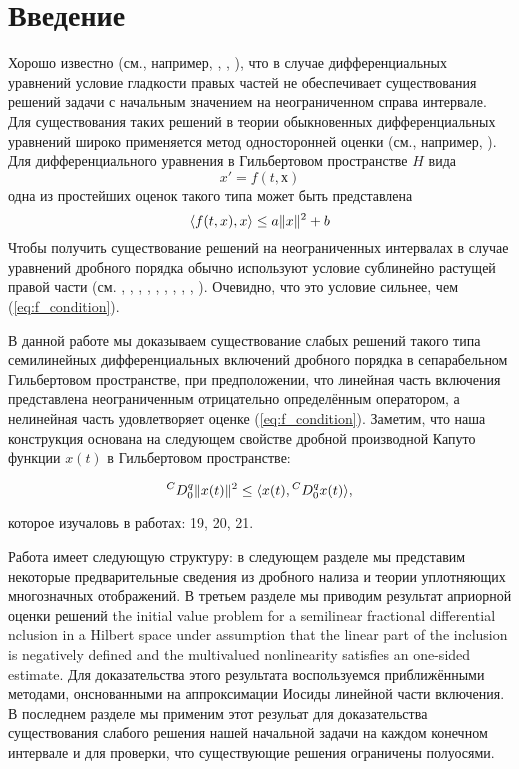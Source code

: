 \section{Введение}

Хорошо известно (см., например, \cite{coddington}, \cite{hartman}, \cite{krasnoselskii}), что в случае
дифференциальных уравнений условие гладкости правых частей не обеспечивает существования решений задачи с
начальным значением на неограниченном справа интервале. Для существования таких решений в теории обыкновенных
дифференциальных уравнений широко применяется метод односторонней оценки (см., например, \cite{coddington}).
Для дифференциального уравнения в Гильбертовом пространстве $H$ вида
\begin{equation*}
    x' = f(t,х)
\end{equation*}
\noindent одна из простейших оценок такого типа может быть представлена
\begin{equation}
    \label{eq:f_condition}
    \langle f(t,x),x\rangle \leq a \lVert x\rVert^{2} + b
\end{equation}
\noindent Чтобы получить существование решений на неограниченных интервалах в случае уравнений дробного порядка
обычно используют условие сублинейно растущей правой части (см. \cite{afanasova_nca}, \cite{afanasova_rm}, \cite{appell},
\cite{benedetti}, \cite{mainardi}, \cite{kamenskii_fpt}, \cite{kamenskii_aa}, \cite{kamenskii_fpta17}, \cite{kamenskii_fpta19},
\cite{kamenskii_m}). Очевидно, что это условие сильнее, чем (\ref{eq:f_condition}).

В данной работе мы доказываем существование слабых решений такого типа семилинейных дифференциальных включений дробного
порядка в сепарабельном Гильбертовом пространстве, при предположении, что линейная часть включения представлена неограниченным
отрицательно определённым оператором, а нелинейная часть удовлетворяет оценке (\ref{eq:f_condition}). Заметим, что
наша конструкция основана на следующем свойстве дробной производной Капуто функции $x(t)$ в Гильбертовом пространстве:

\begin{equation*}
    {}^{C} D_{0}^{q} \lVert x(t)\rVert^{2} \leq \langle x(t), {}^{C} D_{0}^{q} x(t) \rangle,
\end{equation*}

\noindent которое изучаловь в работах: 19, 20, 21.

Работа имеет следующую структуру: в следующем разделе мы представим некоторые предварительные сведения из
дробного нализа и теории уплотняющих многозначных отображений. В третьем разделе мы приводим результат априорной
оценки решений the initial value problem for a semilinear fractional differential nclusion in a Hilbert space under
assumption that the linear part of the inclusion is negatively defined and the multivalued nonlinearity satisfies an
one-sided estimate. Для доказательства этого результата воспользуемся приближёнными методами, онснованными на аппроксимации
Иосиды линейной части включения. В последнем разделе мы применим этот резульат для доказательства существования
слабого решения нашей начальной задачи на каждом конечном интервале и для проверки, что существующие решения ограничены
полуосями.

